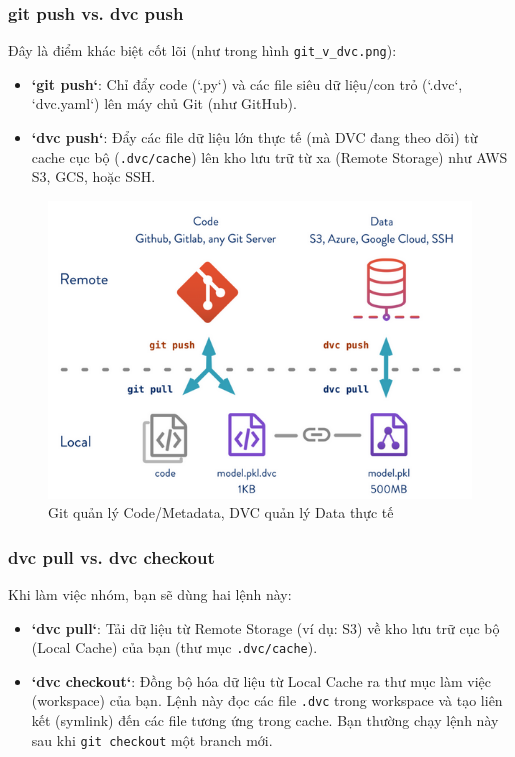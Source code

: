 \documentclass[11pt]{article}
\begin{document}
\subsubsection{git push vs. dvc push}
Đây là điểm khác biệt cốt lõi (như trong hình \texttt{git\_v\_dvc.png}):
\begin{itemize}
    \item \textbf{`git push`}: Chỉ đẩy code (`.py`) và các file siêu dữ liệu/con trỏ (`.dvc`, `dvc.yaml`) lên máy chủ Git (như GitHub).
    \item \textbf{`dvc push`}: Đẩy các file dữ liệu lớn thực tế (mà DVC đang theo dõi) từ cache cục bộ (\texttt{.dvc/cache}) lên kho lưu trữ từ xa (Remote Storage) như AWS S3, GCS, hoặc SSH.
\end{itemize}

\begin{figure}[H]
    \centering
    \includegraphics[width=0.7\linewidth]{images/git_v_dvc.png}
    \caption{Git quản lý Code/Metadata, DVC quản lý Data thực tế}
\end{figure}

\subsubsection{dvc pull vs. dvc checkout}
Khi làm việc nhóm, bạn sẽ dùng hai lệnh này:
\begin{itemize}
    \item \textbf{`dvc pull`}: Tải dữ liệu từ Remote Storage (ví dụ: S3) về kho lưu trữ cục bộ (Local Cache) của bạn (thư mục \texttt{.dvc/cache}).
    \item \textbf{`dvc checkout`}: Đồng bộ hóa dữ liệu từ Local Cache ra thư mục làm việc (workspace) của bạn. Lệnh này đọc các file \texttt{.dvc} trong workspace và tạo liên kết (symlink) đến các file tương ứng trong cache. Bạn thường chạy lệnh này sau khi \texttt{git checkout} một branch mới.
\end{itemize}
\end{document}
